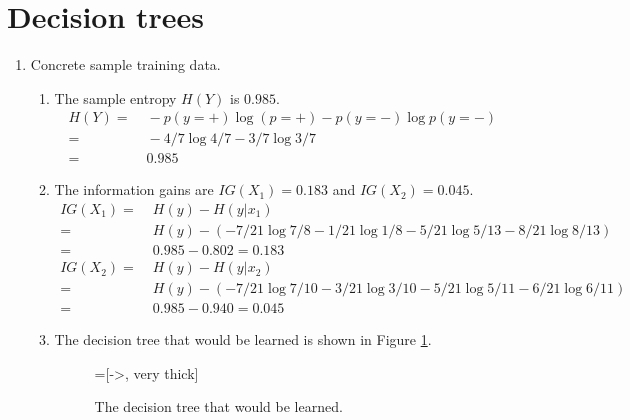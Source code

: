 \section{Decision trees}

\begin{enumerate}
\item Concrete sample training data.
  \begin{enumerate}
  \item The sample entropy $H(Y)$ is $0.985$.
    \begin{align*}
      H(Y)= & \;-p(y=+)\log(p=+)-p(y=-)\log p(y=-)\\
= & \;-4/7\log4/7-3/7\log3/7\\
= & \;0.985
    \end{align*}

  \item The information gains are $IG(X_1) = 0.183$ and $IG(X_2) = 0.045$.  
    \begin{align*}
      IG(X_{1})= & \; H(y)-H(y|x_{1})\\
= & \; H(y)-(-7/21\log7/8-1/21\log1/8-5/21\log5/13-8/21\log8/13)\\
= & \;0.985-0.802=0.183\\
IG(X_{2})= & \; H(y)-H(y|x_{2})\\
= & \; H(y)-(-7/21\log7/10-3/21\log3/10-5/21\log5/11-6/21\log6/11)\\
= & \;0.985-0.940=0.045
    \end{align*}

  \item The decision tree that would be learned is shown in Figure
    \ref{fig:decision_tree}.
    \begin{figure}[H]
      \centering
      =[->, very thick]
      \caption{The decision tree that would be learned.}
      \label{fig:decision_tree}
    \end{figure}
  \end{enumerate}


\end{enumerate}
